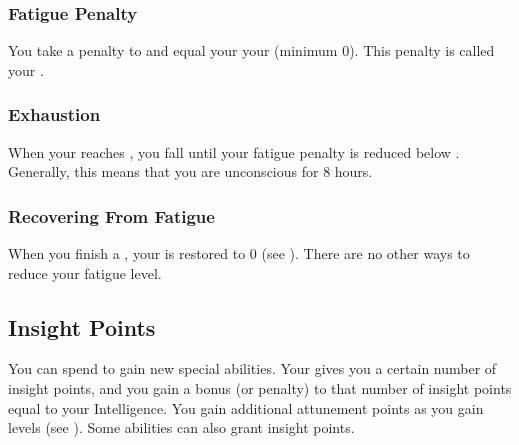             \subsubsection{Fatigue Penalty}\label{Fatigue Penalty}
                You take a penalty to  and  equal your  \sub your  (minimum 0).
                This penalty is called your .

        \subsubsection{Exhaustion}\label{Exhaustion}
            When your  reaches , you fall \unconscious until your fatigue penalty is reduced below .
            Generally, this means that you are unconscious for 8 hours.

        \subsubsection{Recovering From Fatigue}
            When you finish a , your  is restored to 0 (see ).
            There are no other ways to reduce your fatigue level.

    \subsection{Insight Points}\label{Insight Points}
        You can spend  to gain new special abilities.
        Your  gives you a certain number of insight points, and you gain a bonus (or penalty) to that number of insight points equal to your Intelligence.
        You gain additional attunement points as you gain levels (see ).
        Some abilities can also grant insight points.
        

